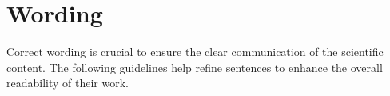 \chapter{Wording}
\label{ch:wording}

Correct wording is crucial to ensure the clear communication of the scientific content.
The following guidelines help refine sentences to enhance the overall readability of their work.
















